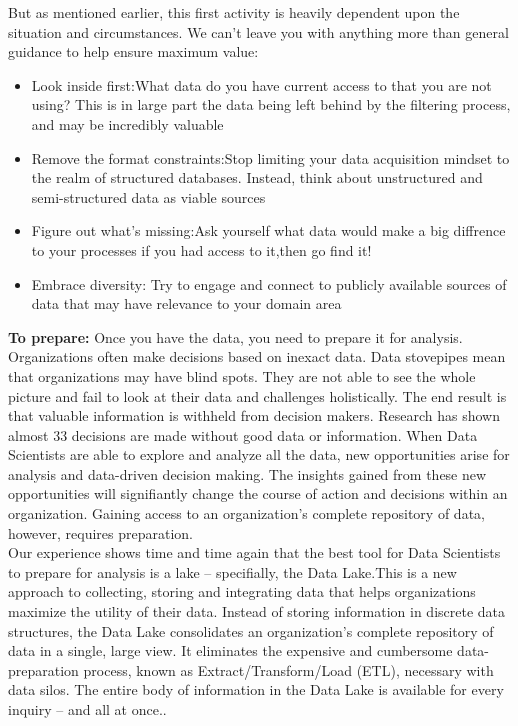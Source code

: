 \documentclass[a4paper,12pt,oneside]{report}
\begin{document}
{\begin{enumerate}
{But as mentioned earlier, this first activity is heavily dependent upon the situation and circumstances. We can’t leave you with anything more than general guidance to help ensure maximum value:
\begin{itemize}
\item{Look inside first:}{What data do you have current access to that you are not using? This is in large part the data being left behind by the filtering process, and may be incredibly valuable}
\item{Remove the format constraints:}{Stop limiting your data acquisition mindset to the realm of structured databases. Instead, think about unstructured and semi-structured data as viable sources}
\item{Figure out what’s missing:}{Ask yourself what data would make a big diffrence to your processes if you had access to it,then go find it!}
\item{Embrace diversity: }{Try to engage and connect to publicly available sources of data that may have relevance to your domain area}
\end{itemize}
\item \textbf {To prepare:} Once you have the data, you need to prepare it for analysis. Organizations often make decisions based on inexact data. Data stovepipes mean that organizations may have blind spots. They are not able to see the whole picture and fail to look at their data and challenges holistically. The end result is that valuable information is withheld from decision makers. Research has shown almost 33%
decisions are made without good data or information.  When Data Scientists are able to explore and analyze all the data, new opportunities arise for analysis and data-driven decision making. The
insights gained from these new opportunities will signifiantly change the course of action and decisions within an organization. Gaining
access to an organization’s complete repository of data, however, requires preparation.\\
Our experience shows time and time again that the best tool for Data Scientists to prepare for analysis is a lake – specifially, the Data Lake.This is a new approach to collecting, storing and integrating
data that helps organizations maximize the utility of their data. Instead of storing information in discrete data structures, the Data Lake consolidates an organization’s complete repository of data in a single, large view. It eliminates the expensive and cumbersome
data-preparation process, known as Extract/Transform/Load (ETL), necessary with data silos. The entire body of information in the Data Lake is available for every inquiry – and all at once..}

\end{enumerate}}
\end{document}
